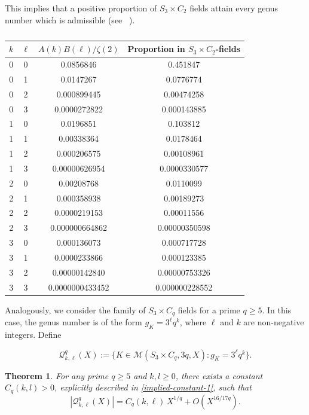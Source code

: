 \documentclass[11pt,reqno]{amsart}
\newcommand{\cM}{\mathcal{M}}
\newcommand{\cQ}{\mathcal{Q}}
\newtheorem{theorem}{Theorem}[section]
\theoremstyle{definition}
\theoremstyle{remark}
\begin{document}
This implies that a positive proportion of $S_3\times C_2$ fields attain every genus number which is admissible (see ~).
\begin{table}[t]
\centering
\small
\begin{tabular}{|c|c|c|c|}
\hline
$k$ & $\ell$ &
$A(k)B(\ell)/\zeta(2)$ &
Proportion in $S_3\times C_2$-fields\\[2pt]
\hline

0 & 0 & 0.0856846 & 0.451847 \\
0 & 1 & 0.0147267 & 0.0776774 \\
0 & 2 & 0.000899445 & 0.00474258 \\
0 & 3 & 0.0000272822 & 0.000143885 \\
1 & 0 & 0.0196851 & 0.103812 \\
1 & 1 & 0.00338364 & 0.0178464 \\
1 & 2 & 0.000206575 & 0.00108961 \\
1 & 3 & 0.00000626954 & 0.0000330577 \\

2 & 0 & 0.00208768 & 0.0110099 \\
2 & 1 & 0.000358938 & 0.00189273 \\
2 & 2 & 0.0000219153 & 0.00011556 \\
2 & 3 & 0.000000664862 & 0.00000350598 \\

3 & 0 & 0.000136073 & 0.000717728 \\
3 & 1 & 0.0000233866 & 0.000123385 \\
3 & 2 & 0.00000142840 & 0.00000753326 \\
3 & 3 & 0.0000000433452 & 0.000000228552 \\

\hline
\end{tabular}
\caption{}
\label{Table-1}
\end{table}
Analogously, we consider the family of $S_3\times C_q$ fields for a prime $q\geq 5$. In this case, the genus number is of the form $g_K= 3^{\ell} q^k$, where $\ell$ and $k$ are non-negative integers. Define

\begin{equation*}
    \cQ^q_{k,\ell}(X):= \{K\in \cM(S_3\times C_q,3q,X) : g_K = 3^{\ell} q^{k}\}. 
\end{equation*}

\begin{theorem}\label{S_3-C_q-theorem}
    For any prime $q\geq 5$ and $k,l\geq 0$, there exists a constant $C_q(k,l)>0$, explicitly described in \eqref{implied-constant-1}, such that
    \begin{equation*}
        |\cQ^q_{k,\ell}(X)| = C_q(k,\ell) \, X^{1/q} + O\left(X^{16/17q}\right).
    \end{equation*}
\end{theorem}
\end{document}
